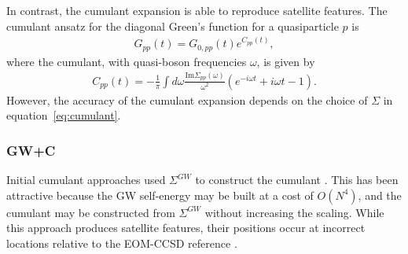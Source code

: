 \documentclass[letterpaper]{article}
\begin{document}
In contrast, the cumulant expansion is able to reproduce satellite features\cite{Langreth1970-iq}. The cumulant ansatz for the diagonal Green's function for a quasiparticle $p$ is \begin{align} G_{pp}(t) = G_{0,pp}(t) e^{C_{pp}(t)}, \label{eq:cumulant_G}\end{align} where the cumulant, with quasi-boson frequencies $\omega$, is given by \begin{align} C_{pp}(t) = -\frac{1}{\pi}\int d\omega \frac{\mathrm{Im} \Sigma_{pp}(\omega)}{\omega^2} \left(e^{-i\omega t} + i \omega t -1\right). \label{eq:cumulant}\end{align}
However, the accuracy of the cumulant expansion depends on the choice of $\Sigma$ in equation~\ref{eq:cumulant}.
\subsubsection{GW+C} Initial cumulant approaches used $\Sigma^{GW}$ to construct the cumulant \cite{Holm1997-by}. This has been attractive because the GW self-energy may be built at a cost of $O(N^4)$, and the cumulant may be constructed from $\Sigma^{GW}$ without increasing the scaling.
 While this approach produces satellite features, their positions occur at incorrect locations relative to the EOM-CCSD reference \cite{McClain2016-md}. 
\end{document}
